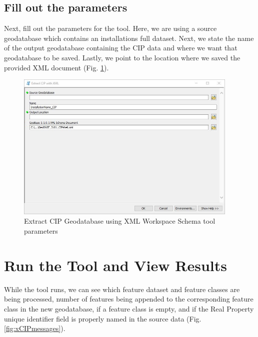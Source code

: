 \documentclass[openany]{book}
\theoremstyle{definition}
\theoremstyle{definition}
\theoremstyle{definition}
\theoremstyle{remark}
\begin{document}
\subsection{Fill out the parameters}\label{fill-out-the-parameters}

Next, fill out the parameters for the tool. Here, we are using a source
geodatabase which contains an installations full dataset. Next, we state
the name of the output geodatabase containing the CIP data and where we
want that geodatabase to be saved. Lastly, we point to the location
where we saved the provided XML document (Fig. \ref{fig:xCIPparams}).

\begin{figure}[H]

{\centering \includegraphics[width=4.19in,]{figures/xCIP-params} 

}

\caption{Extract CIP Geodatabase using XML Workspace Schema tool parameters}\label{fig:xCIPparams}
\end{figure}

\section{Run the Tool and View
Results}\label{run-the-tool-and-view-results}

While the tool runs, we can see which feature dataset and feature
classes are being processed, number of features being appended to the
corresponding feature class in the new geodatabase, if a feature class
is empty, and if the Real Property unique identifier field is properly
named in the source data (Fig. \ref{fig:xCIPmessages}).
\end{document}
